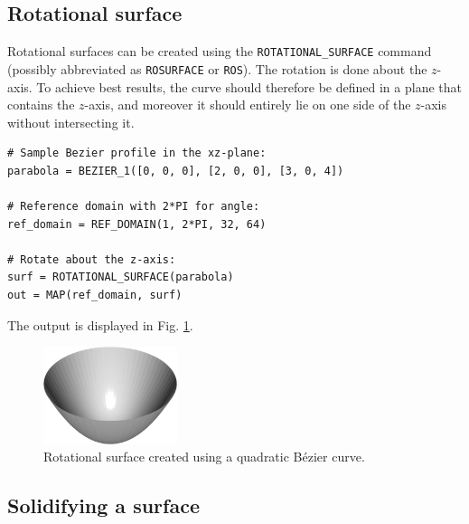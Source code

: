 \subsection{Rotational surface}

Rotational surfaces can be created using the {\tt ROTATIONAL\_SURFACE} command
(possibly abbreviated as {\tt ROSURFACE} or {\tt ROS}).
The rotation is done about the $z$-axis. To achieve best results, the curve
should therefore be defined in a plane that contains the $z$-axis, and moreover 
it should entirely lie on one side of the $z$-axis without intersecting it.\\

\begin{bbox}
\begin{verbatim}
# Sample Bezier profile in the xz-plane: 
parabola = BEZIER_1([0, 0, 0], [2, 0, 0], [3, 0, 4])
  
# Reference domain with 2*PI for angle:
ref_domain = REF_DOMAIN(1, 2*PI, 32, 64)

# Rotate about the z-axis:
surf = ROTATIONAL_SURFACE(parabola)
out = MAP(ref_domain, surf)
\end{verbatim}
\end{bbox}
\vspace{6mm}

\noindent
The output is displayed in Fig. \ref{fig:curves-4}.\\

\begin{figure}[!ht]
\begin{center}
\includegraphics[width=0.35\textwidth]{img/curves-4.png}
\end{center}
\vspace{-4mm}
\caption{Rotational surface created using a quadratic B\'ezier curve.}
\label{fig:curves-4}
\end{figure}

\subsection{Solidifying a surface}

